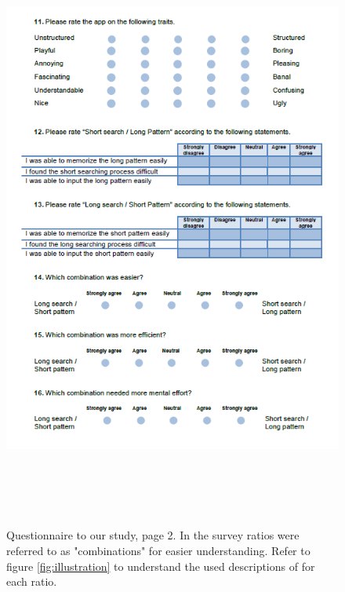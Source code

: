 \begin{figure}[H]
\includegraphics[width=15cm, height=20cm]{Chapters/graphics/survey2.PNG}
\caption{Questionnaire to our study, page 2. In the survey ratios were referred to as "combinations" for easier understanding. Refer to figure \ref{fig:illustration} to understand the used descriptions of for each ratio.}
\label{fig:survey2}
\end{figure}

